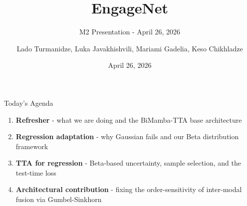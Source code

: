 \documentclass[aspectratio=169]{beamer}
\title{EngageNet}
\subtitle{M2 Presentation - April 26, 2026}
\author{Lado Turmanidze, Luka Javakhishvili, Mariami Gadelia, Keso Chikhladze}
\institute{\small{Supervisors: Dr. Philipp M\"{u}ller \& Beso Mikaberidze}}
\date{April 26, 2026}
\begin{document}
	
	\begin{frame}
		\titlepage
	\end{frame}
	
	\begin{frame}{Today's Agenda}
		\begin{enumerate}
			\item \textbf{Refresher} - what we are doing and the BiMamba-TTA base architecture
			\item \textbf{Regression adaptation} - why Gaussian fails and our Beta distribution framework
			\item \textbf{TTA for regression} - Beta-based uncertainty, sample selection, and the test-time loss
			\item \textbf{Architectural contribution} - fixing the order-sensitivity of inter-modal fusion via Gumbel-Sinkhorn
		\end{enumerate}
	\end{frame}
	
\end{document}
